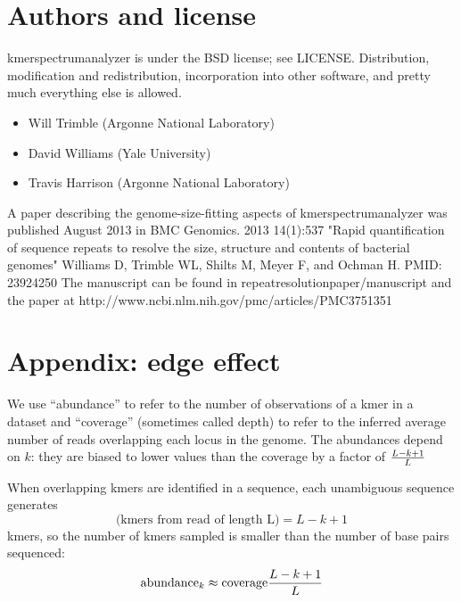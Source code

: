 \documentclass[11pt,fullpage]{article}
\begin{document}
\section{Authors and license}
kmerspectrumanalyzer is under the BSD license; see LICENSE.
Distribution, modification and redistribution, incorporation
into other software, and pretty much everything else is allowed.

\begin{itemize}
\item Will Trimble (Argonne National Laboratory)
\item David Williams (Yale University)
\item Travis Harrison (Argonne National Laboratory)
\end{itemize}

A paper describing the genome-size-fitting aspects of kmerspectrumanalyzer was
published August 2013 in BMC Genomics. 2013 14(1):537
"Rapid quantification of sequence repeats to resolve the size, 
structure and contents of bacterial genomes" 
Williams D, Trimble WL, Shilts M, Meyer F, and Ochman H.  PMID: 23924250
The manuscript can be found in repeatresolutionpaper/manuscript and 
the paper at http://www.ncbi.nlm.nih.gov/pmc/articles/PMC3751351

\section{Appendix: edge effect}
We use ``abundance'' to refer to the number of observations of a kmer in a 
dataset and ``coverage'' (sometimes called depth) to refer to the inferred average 
number of reads overlapping each locus in the genome.  The abundances depend on $k$: 
they are biased to lower values than 
the coverage by a factor of $ {L - k + 1} \over {L} $

When overlapping kmers are identified in a sequence, each unambiguous sequence generates 
$$ \textrm{(kmers from read of length L)} = L - k + 1 $$
kmers, so the number of kmers sampled is smaller than the number of base pairs sequenced:
$$\textrm{abundance}_k \approx \textrm{coverage} {{L - k + 1} \over {L}}$$

{}

\end{document}
